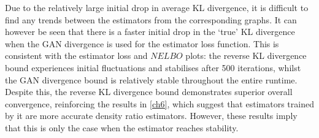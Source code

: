 \documentclass[honours,12pt]{unswthesis}
\numberwithin{equation}{section}
\theoremstyle{definition}
\begin{document}
Due to the relatively large initial drop in average KL divergence, it is difficult to find any trends between the estimators from the corresponding graphs. It can however be seen that there is a faster initial drop in the `true' KL divergence when the GAN divergence is used for the estimator loss function. This is consistent with the estimator loss and $NELBO$ plots: the reverse KL divergence bound experiences initial fluctuations and stabilises after 500 iterations, whilst the GAN divergence bound is relatively stable throughout the entire runtime. Despite this, the reverse KL divergence bound demonstrates superior overall convergence, reinforcing the results in \autoref{ch6}, which suggest that estimators trained by it are more accurate density ratio estimators. However, these results imply that this is only the case when the estimator reaches stability.
\end{document}
